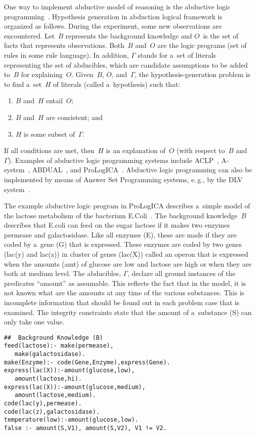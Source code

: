 \begin{multicols}{2}
  One way to implement abductive model of reasoning is the abductive logic
programming~\cite{17-kl}. Hypothesis generation in abduction logical framework is
organized as follows. During the experiment, some new observations are
encountered. Let~$B$ represents the background knowledge and $O$~is the set of facts
that represents observations. Both~$B$ and~$O$ are the logic programs (set of rules in
some rule language). In addition, $\Gamma$ stands for a~set of literals representing
the set of abducibles, which are candidate assumptions to be added to~$B$ for
explaining~$O$. Given~$B$, $O$, and~$\Gamma$, the hypothesis-generation
problem is to find a~set~$H$ of literals (called a~hypothesis) such that:
\begin{enumerate}[(1)]
\item $B$ and~$H$ entail~$O$;
\item $B$ and~$H$ are consistent; and
\item $H$ is some subset
of~$\Gamma$.
\end{enumerate}
  If all conditions are met, then~$H$ is an explanation of~$O$ (with
respect to~$B$ and~$\Gamma$).  Examples of abductive logic programming systems
include ACLP~\cite{18-kl}, A-system~\cite{19-kl}, ABDUAL~\cite{20-kl}, and
ProLogICA~\cite{21-kl}. Abductive logic programming can also be implemented by
means of Answer Set Programming systems, e.\,g., by the DLV system~\cite{22-kl}.

  The example abductive logic program in ProLogICA describes a~simple model of
the lactose metabolism of the bacterium E.Coli~\cite{21-kl}. The background
knowledge~$B$ describes that E.coli can feed on the sugar lactose if it makes two
enzymes permease and galactosidase. Like all enzymes (E), these are made if they are
coded by a~gene (G) that is expressed. These enzymes are coded by two genes (lac(y)
and lac(z)) in cluster of genes (lac(X)) called an operon that is expressed when the
amounts (amt) of glucose are low and lactose are high or when they are both at
medium level. The abducibles, $\Gamma$, declare all ground instances of the
predicates ``amount'' as assumable. This reflects the fact that in the model, it is not
known what are the amounts at any time of the various substances. This is incomplete
information that should be found out in each problem case that is examined. The
integrity constraints state that the amount of a~substance (S) can only take one value.
 {\small \begin{verbatim}
##  Background Knowledge (B)
feed(lactose):- make(permease),
   make(galactosidase).
make(Enzyme):- code(Gene,Enzyme),express(Gene).
express(lac(X)):-amount(glucose,low),
   amount(lactose,hi).
express(lac(X)):-amount(glucose,medium),
   amount(lactose,medium).
code(lac(y),permease).
code(lac(z),galactosidase).
temperature(low):-amount(glucose,low).
false :- amount(S,V1), amount(S,V2), V1 != V2.


\end{verbatim}}
\end{multicols}
